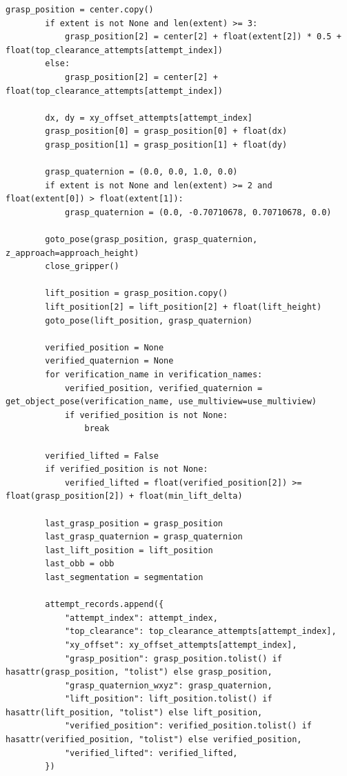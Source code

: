 \documentclass{llmxive}
\begin{document}
\begin{lstlisting}[style=ratsappendixpython]
        grasp_position = center.copy()
        if extent is not None and len(extent) >= 3:
            grasp_position[2] = center[2] + float(extent[2]) * 0.5 + float(top_clearance_attempts[attempt_index])
        else:
            grasp_position[2] = center[2] + float(top_clearance_attempts[attempt_index])

        dx, dy = xy_offset_attempts[attempt_index]
        grasp_position[0] = grasp_position[0] + float(dx)
        grasp_position[1] = grasp_position[1] + float(dy)

        grasp_quaternion = (0.0, 0.0, 1.0, 0.0)
        if extent is not None and len(extent) >= 2 and float(extent[0]) > float(extent[1]):
            grasp_quaternion = (0.0, -0.70710678, 0.70710678, 0.0)

        goto_pose(grasp_position, grasp_quaternion, z_approach=approach_height)
        close_gripper()

        lift_position = grasp_position.copy()
        lift_position[2] = lift_position[2] + float(lift_height)
        goto_pose(lift_position, grasp_quaternion)

        verified_position = None
        verified_quaternion = None
        for verification_name in verification_names:
            verified_position, verified_quaternion = get_object_pose(verification_name, use_multiview=use_multiview)
            if verified_position is not None:
                break

        verified_lifted = False
        if verified_position is not None:
            verified_lifted = float(verified_position[2]) >= float(grasp_position[2]) + float(min_lift_delta)

        last_grasp_position = grasp_position
        last_grasp_quaternion = grasp_quaternion
        last_lift_position = lift_position
        last_obb = obb
        last_segmentation = segmentation

        attempt_records.append({
            "attempt_index": attempt_index,
            "top_clearance": top_clearance_attempts[attempt_index],
            "xy_offset": xy_offset_attempts[attempt_index],
            "grasp_position": grasp_position.tolist() if hasattr(grasp_position, "tolist") else grasp_position,
            "grasp_quaternion_wxyz": grasp_quaternion,
            "lift_position": lift_position.tolist() if hasattr(lift_position, "tolist") else lift_position,
            "verified_position": verified_position.tolist() if hasattr(verified_position, "tolist") else verified_position,
            "verified_lifted": verified_lifted,
        })


\end{lstlisting}
\end{document}
